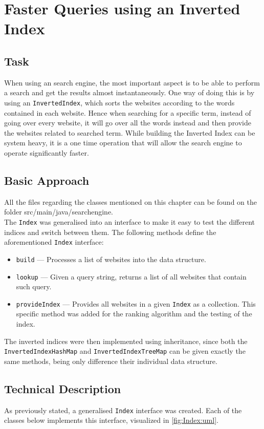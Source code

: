 \chapter{Faster Queries using an Inverted Index}

\section{Task}
When using an search engine, the most important aspect is to be able to perform a search and get the results almost instantaneously. One way of doing this is by using an {\tt InvertedIndex}, which sorts the websites according to the words contained in each website. Hence when searching for a specific term, instead of going over every website, it will go over all the words instead and then provide the websites related to searched term. While building the Inverted Index can be system heavy, it is a one time operation that will allow the search engine to operate significantly faster.

\section{Basic Approach}
All the files regarding the classes mentioned on this chapter can be found on the folder src/main/java/searchengine.\\
The {\tt Index} was generalised into an interface to make it easy to test the different indices and switch between them. The following methods define the aforementioned {\tt Index} interface:
\begin{itemize}
    \item {\tt build} — Processes a list of websites into the data structure.
    \item {\tt lookup} — Given a query string, returns a list of all websites that contain such query.
    \item {\tt provideIndex} — Provides all websites in a given {\tt Index} as a collection. This specific method was added for the ranking algorithm and the testing of the index.
\end{itemize}
The inverted indices were then implemented using inheritance, since both the {\tt InvertedIndexHashMap} and {\tt InvertedIndexTreeMap} can be given exactly the same methods, being only difference their individual data structure.

\section{Technical Description}
As previously stated, a generalised {\tt Index} interface was created. Each of the classes below implements this interface, visualized in \ref{fig:Index:uml}.

